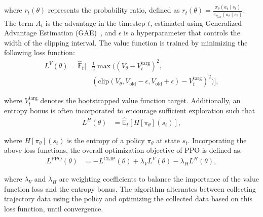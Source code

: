 \noindent where $r_t(\theta)$ represents the probability ratio, defined as $r_t(\theta) = \frac{\pi_\theta(a_t \mid s_t)}{\pi_{\theta_{\text{old}}}(a_t \mid s_t)}$. 
The term $A_t$ is the advantage in the timestep $t$, estimated using Generalized Advantage Estimation (GAE)~\citep{schulman2015high}, 
and $\epsilon$ is a hyperparameter that controls the width of the clipping interval. The value function is trained by minimizing the following loss function:
{\small
\begin{align}
L^V(\theta) = \hat{\mathbb{E}}_t \big[ &\frac{1}{2} \max \big( 
\left( V_\theta - V_t^{\text{targ}} \right)^2, \nonumber
\\
&\left( \text{clip}(V_\theta, V_{\text{old}} - \epsilon, V_{\text{old}} + \epsilon) - V_t^{\text{targ}} \right)^2 
\big) \big], \nonumber
\end{align}
}

\noindent where $V_t^{\text{targ}}$ denotes the bootstrapped value function target. Additionally, an entropy bonus is often incorporated to encourage sufficient exploration such that
\begin{equation}
\begin{aligned}
L^H(\theta) &= \hat{\mathbb{E}}_t \left[ H[\pi_\theta](s_t) \right], \nonumber
\end{aligned}
\end{equation}

\noindent where $H[\pi_\theta](s_t)$ is the entropy of a policy $\pi_\theta$ at state $s_t$. Incorporating the above loss functions, the overall optimization objective of PPO is defined as:
\begin{equation}
\begin{aligned}
L^{\text{PPO}}(\theta) &= -L^{\text{CLIP}}(\theta) + \lambda_V L^V(\theta) - \lambda_H L^H(\theta), \nonumber
\end{aligned}
\end{equation}

\noindent where $\lambda_V$ and $\lambda_H$ are weighting coefficients to balance the importance of the value function loss and the entropy bonus. The algorithm alternates between collecting trajectory data using the policy and optimizing the collected data based on this loss function, until convergence.




